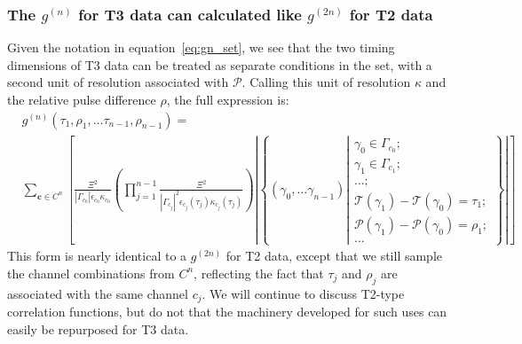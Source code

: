 \documentclass{article}
\newcommand{\braces}[1]{\ensuremath{\left\lbrace #1 \right\rbrace}}
\newcommand{\gn}[1]{\ensuremath{g^{(#1)}}}
\renewcommand{\vec}{\mathbf}
\newcommand{\abs}[1]{\ensuremath{\left|#1\right|}}
\newcommand{\channel}{\ensuremath{c}}
\newcommand{\channels}{\ensuremath{C}}
\newcommand{\Time}{\ensuremath{\mathcal{T}}}
\newcommand{\photon}{\ensuremath{\gamma}}
\newcommand{\photons}{\ensuremath{\Gamma}}
\newcommand{\Pulse}{\ensuremath{\mathcal{P}}}
\newcommand{\integrationtime}{\ensuremath{\Xi}}
\newcommand{\resolution}{\ensuremath{\epsilon}}
\begin{document}
\subsubsection{The \gn{n} for T3 data can calculated like \gn{2n} for T2 data}
Given the notation in equation~\ref{eq:gn_set}, we see that the two timing dimensions of T3 data can be treated as separate conditions in the set, with a second unit of resolution associated with \Pulse. Calling this unit of resolution $\kappa$ and the relative pulse difference $\rho$, the full expression is:
\begin{equation}
\label{eq:gn_set_t3}
\begin{split}
&\gn{n}(\tau_{1},\rho_{1},\ldots\tau_{n-1},\rho_{n-1}) = \\
    &  \sum\limits_{\vec{c}\in \channels^{n}}
                    {
                    \left[
                    \frac{\integrationtime^{2}}
                         {\abs{\photons_{\channel_{0}}}\resolution_{\channel_{0}}\kappa_{\channel_{0}}}
                    \left(
                    \prod_{j=1}^{n-1}{\frac{\integrationtime^{2}}
                                           {\abs{\photons_{c_{j}}}^{2}
                                            \resolution_{c_{j}}(\tau_{j})
                                            \kappa_{c_{j}}(\tau_{j})}}
                    \right)
                    \abs{\braces{(\photon_{0},\ldots\photon_{n-1})
                          \left|\begin{split}
                          \photon_{0}\in\photons_{c_{0}};\\
                          \photon_{1}\in\photons_{c_{1}};\\
                          \ldots;\\
                          \Time(\photon_{1})-\Time(\photon_{0})=\tau_{1};\\
                          \Pulse(\photon_{1})-\Pulse(\photon_{0})=\rho_{1};\\
                          \ldots
                          \end{split}\right.}}
                    \right]
                    }
\end{split}
\end{equation}
This form is nearly identical to a \gn{2n} for T2 data, except that we still sample the channel combinations from $\channels^{n}$, reflecting the fact that $\tau_{j}$ and $\rho_{j}$ are associated with the same channel $\channel_{j}$. We will continue to discuss T2-type correlation functions, but do not that the machinery developed for such uses can easily be repurposed for T3 data.
\end{document}
